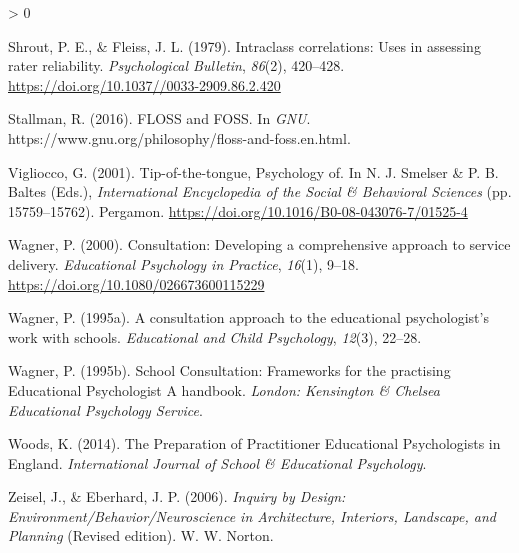 \documentclass[
  english,
  man]{apa7}
\newlength{\cslhangindent}
\newenvironment{CSLReferences}[2] %
 {%
  \setlength{\parindent}{0pt}
  \ifodd #1 \everypar{\setlength{\hangindent}{\cslhangindent}}\ignorespaces\fi
  \ifnum #2 > 0
  \setlength{\parskip}{#2\baselineskip}
  \fi
 }%
 {}
\begin{document}
\begin{CSLReferences}{1}{0}
\leavevmode\hypertarget{ref-shroutIntraclassCorrelationsUses1979}{}%
Shrout, P. E., \& Fleiss, J. L. (1979). Intraclass correlations: Uses in assessing rater reliability. \emph{Psychological Bulletin}, \emph{86}(2), 420--428. \url{https://doi.org/10.1037//0033-2909.86.2.420}

\leavevmode\hypertarget{ref-stallmanFLOSSFOSS2016}{}%
Stallman, R. (2016). {FLOSS} and {FOSS}. In \emph{GNU}. https://www.gnu.org/philosophy/floss-and-foss.en.html.

\leavevmode\hypertarget{ref-viglioccoTipofthetonguePsychology2001}{}%
Vigliocco, G. (2001). Tip-of-the-tongue, {Psychology} of. In N. J. Smelser \& P. B. Baltes (Eds.), \emph{International {Encyclopedia} of the {Social} \& {Behavioral Sciences}} (pp. 15759--15762). {Pergamon}. \url{https://doi.org/10.1016/B0-08-043076-7/01525-4}

\leavevmode\hypertarget{ref-wagnerConsultationDevelopingComprehensive2000}{}%
Wagner, P. (2000). Consultation: {Developing} a comprehensive approach to service delivery. \emph{Educational Psychology in Practice}, \emph{16}(1), 9--18. \url{https://doi.org/10.1080/026673600115229}

\leavevmode\hypertarget{ref-wagnerConsultationApproachEducational1995}{}%
Wagner, P. (1995a). A consultation approach to the educational psychologist's work with schools. \emph{Educational and Child Psychology}, \emph{12}(3), 22--28.

\leavevmode\hypertarget{ref-wagnerSchoolConsultationFrameworks1995}{}%
Wagner, P. (1995b). School {Consultation}: Frameworks for the practising {Educational Psychologist A} handbook. \emph{London: Kensington \& Chelsea Educational Psychology Service}.

\leavevmode\hypertarget{ref-woodsPreparationPractitionerEducational2014}{}%
Woods, K. (2014). The {Preparation} of {Practitioner Educational Psychologists} in {England}. \emph{International Journal of School \& Educational Psychology}.

\leavevmode\hypertarget{ref-zeiselInquiryDesignEnvironment2006}{}%
Zeisel, J., \& Eberhard, J. P. (2006). \emph{Inquiry by {Design}: {Environment}/{Behavior}/{Neuroscience} in {Architecture}, {Interiors}, {Landscape}, and {Planning}} (Revised edition). {W. W. Norton}.

\end{CSLReferences}

\endgroup
\end{document}

